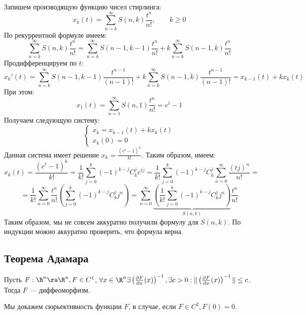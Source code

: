 Запишем производящую функцию чисел стирлинга:
\[x_k(t)=\sum_{n=k}^{\infty} S(n,k)\frac{t^n}{n!},\qquad k\ge 0\]
По рекуррентной формуле имеем:
\[
\sum_{n=k}^{\infty} S(n,k)\frac{t^n}{n!}=
\sum_{n=k}^{\infty} S(n-1,k-1)\frac{t^n}{n!}+k\sum_{n=k}^{\infty} S(n-1,k)\frac{t^n}{n!}
\]
Продифференцируем по \(t\):
\[
x_k'(t) =
\sum_{n=k}^{\infty} S(n-1,k-1)\frac{t^{n - 1}}{(n - 1)!}+k\sum_{n=k}^{\infty} S(n-1,k)\frac{t^{n - 1}}{(n - 1)!} = x_{k - 1}(t) + kx_k(t)
\]
При этом:
\[x_1(t) = \sum_{n=1}^{\infty} S(n,1)\frac{t^n}{n!} = e^t - 1\]
Получаем следующую систему:
\[\left\{\begin{array}{l}
    \dot{x}_k = x_{k - 1}(t) + kx_k(t) \\
    x_k(0) = 0
\end{array}\right.\]
Данная система имеет решение \(x_k = \frac{(e^t - 1)^k}{k!}\). Таким образом, имеем:
\[x_k(t) = \frac{(e^t - 1)^k}{k!} = \frac{1}{k!}\sum_{j = 0}^k (-1)^{k - j}C_k^je^{tj} = \frac{1}{k!}\sum_{j = 0}^k(-1)^{k - j}C_k^j\sum_{n = 0}^\infty \frac{(tj)^n}{n!} =\]
\[= \frac{1}{k!}\sum_{n = 0}^\infty \frac{t^n}{n!}\left( \sum_{j = 0}^k(-1)^{k - j}C_k^jj^n \right) = \sum_{n = 0}^\infty \underbrace{\left(\frac{1}{k!} \sum_{j = 0}^k(-1)^{k - j}C_k^jj^n \right)}_{S(n, k)}\frac{t^n}{n!}\]
Таким образом, мы не совсем аккуратно получили формулу для \(S(n, k)\). По индукции можно аккуратно проверить, что формула верна.
\subsection{Теорема Адамара}
\begin{theorem}
    Пусть \(F: \R^n \ra \R^n, F \in C^1\), \(\forall x \in \R^n \exists \left( \frac{\partial F}{\partial x}(x) \right)^{-1}, \exists c > 0: \|\left( \frac{\partial F}{\partial x}(x) \right)^{-1}\| \le c\). Тогда \(F\) --- диффеоморфизм.
\end{theorem}

Мы докажем сюрьективность функции \(F\), в случае, если \(F \in C^2, F(0) = 0\).


